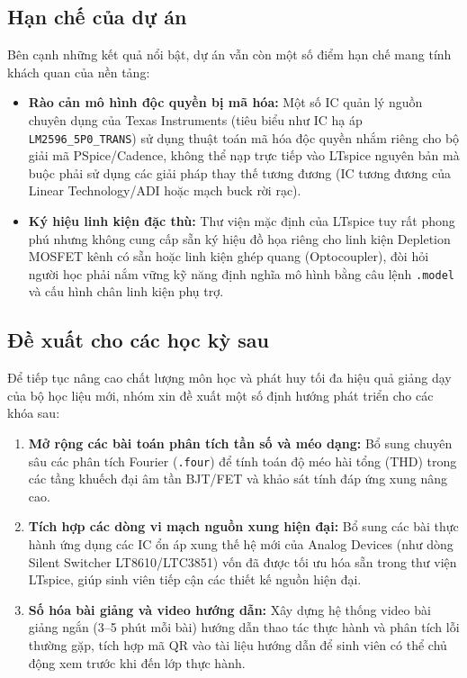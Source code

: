 \documentclass[12pt,a4paper]{article}
\begin{document}
\subsection{Hạn chế của dự án}
Bên cạnh những kết quả nổi bật, dự án vẫn còn một số điểm hạn chế mang tính khách quan của nền tảng:
\begin{itemize}[itemsep=2pt]
  \item \textbf{Rào cản mô hình độc quyền bị mã hóa:} Một số IC quản lý nguồn chuyên dụng của Texas Instruments (tiêu biểu như IC hạ áp \texttt{LM2596\_5P0\_TRANS}) sử dụng thuật toán mã hóa độc quyền nhắm riêng cho bộ giải mã PSpice/Cadence, không thể nạp trực tiếp vào LTspice nguyên bản mà buộc phải sử dụng các giải pháp thay thế tương đương (IC tương đương của Linear Technology/ADI hoặc mạch buck rời rạc).
  \item \textbf{Ký hiệu linh kiện đặc thù:} Thư viện mặc định của LTspice tuy rất phong phú nhưng không cung cấp sẵn ký hiệu đồ họa riêng cho linh kiện Depletion MOSFET kênh có sẵn hoặc linh kiện ghép quang (Optocoupler), đòi hỏi người học phải nắm vững kỹ năng định nghĩa mô hình bằng câu lệnh \texttt{.model} và cấu hình chân linh kiện phụ trợ.
\end{itemize}

\subsection{Đề xuất cho các học kỳ sau}
Để tiếp tục nâng cao chất lượng môn học và phát huy tối đa hiệu quả giảng dạy của bộ học liệu mới, nhóm xin đề xuất một số định hướng phát triển cho các khóa sau:
\begin{enumerate}[label=\arabic*., itemsep=2pt]
  \item \textbf{Mở rộng các bài toán phân tích tần số và méo dạng:} Bổ sung chuyên sâu các phân tích Fourier (\texttt{.four}) để tính toán độ méo hài tổng (THD) trong các tầng khuếch đại âm tần BJT/FET và khảo sát tính đáp ứng xung nâng cao.
  \item \textbf{Tích hợp các dòng vi mạch nguồn xung hiện đại:} Bổ sung các bài thực hành ứng dụng các IC ổn áp xung thế hệ mới của Analog Devices (như dòng Silent Switcher LT8610/LTC3851) vốn đã được tối ưu hóa sẵn trong thư viện LTspice, giúp sinh viên tiếp cận các thiết kế nguồn hiện đại.
  \item \textbf{Số hóa bài giảng và video hướng dẫn:} Xây dựng hệ thống video bài giảng ngắn (3--5 phút mỗi bài) hướng dẫn thao tác thực hành và phân tích lỗi thường gặp, tích hợp mã QR vào tài liệu hướng dẫn để sinh viên có thể chủ động xem trước khi đến lớp thực hành.
\end{enumerate}
\end{document}
